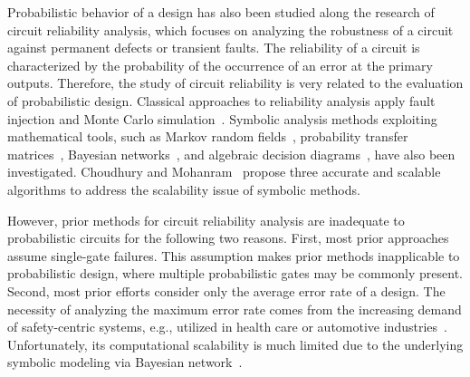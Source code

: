 Probabilistic behavior of a design has also been studied along the research of circuit reliability analysis,
which focuses on analyzing the robustness of a circuit against permanent defects or transient faults.
The reliability of a circuit is characterized by the probability of the occurrence of an error at the primary outputs.
Therefore, the study of circuit reliability is very related to the evaluation of probabilistic design.
Classical approaches to reliability analysis apply fault injection and Monte Carlo simulation~\cite{Mohanram2003}.
Symbolic analysis methods exploiting mathematical tools,
such as Markov random fields~\cite{Bahar2003},
probability transfer matrices~\cite{Krishnaswamy2005},
Bayesian networks~\cite{Rejimon2005},
and algebraic decision diagrams~\cite{Miskov-Zivanov2006},
have also been investigated.
Choudhury and Mohanram~\cite{Choudhury2009} propose three accurate and scalable algorithms to address the scalability issue of symbolic methods.

However, prior methods for circuit reliability analysis are inadequate to probabilistic circuits
for the following two reasons.
First, most prior approaches assume single-gate failures.
This assumption makes prior methods inapplicable to probabilistic design,
where multiple probabilistic gates may be commonly present.
Second, most prior efforts consider only the average error rate of a design.
The necessity of analyzing the maximum error rate comes from the increasing demand of safety-centric systems,
e.g., utilized in health care or automotive industries~\cite{Lingasubramanian2007,Lingasubramanian2011}.
Unfortunately, its computational scalability is much limited due to the underlying symbolic modeling via Bayesian network~\cite{Jensen1996}.